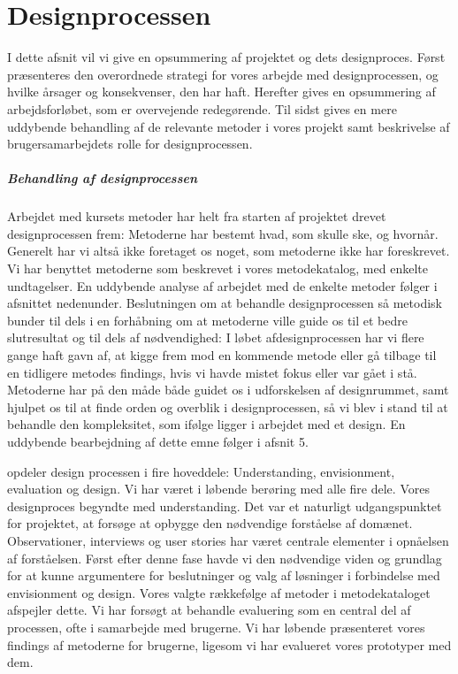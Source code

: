 \chapter{Designprocessen}
I dette afsnit vil vi give en opsummering af projektet og dets designproces.
Først præsenteres den overordnede strategi for vores arbejde med designprocessen, og hvilke årsager og konsekvenser, den har haft.
Herefter gives en opsummering af arbejdsforløbet, som er overvejende redegørende. 
Til sidst gives en mere uddybende behandling af de relevante metoder i vores projekt samt beskrivelse af brugersamarbejdets rolle for designprocessen.

\paragraph{Behandling af designprocessen}
Arbejdet med kursets metoder har helt fra starten af projektet drevet designprocessen frem: Metoderne har bestemt hvad, som skulle ske, og hvornår. Generelt har vi altså ikke foretaget os noget, som metoderne ikke har foreskrevet. Vi har benyttet metoderne som beskrevet i vores metodekatalog, med enkelte undtagelser. En uddybende analyse af arbejdet med de enkelte metoder følger i afsnittet nedenunder.
Beslutningen om at behandle designprocessen så metodisk bunder til dels i en forhåbning om at metoderne ville guide os til et bedre slutresultat og til dels af nødvendighed: I løbet afdesignprocessen har vi flere gange haft gavn af, at kigge frem mod en kommende metode eller gå tilbage til en tidligere metodes findings, hvis vi havde mistet fokus eller var gået i stå. 
Metoderne har på den måde både guidet os i udforskelsen af designrummet, samt hjulpet os til at finde orden og overblik i designprocessen, så vi blev i stand til at behandle den kompleksitet, som ifølge \citep{Stolterman} ligger i arbejdet med et design. En uddybende bearbejdning af dette emne følger i afsnit 5.

\citep{Benyon} opdeler design processen i fire hoveddele: Understanding, envisionment, evaluation og design. Vi har været i løbende berøring med alle fire dele. 
Vores designproces begyndte med understanding. Det var et naturligt udgangspunktet for projektet, at forsøge at opbygge den nødvendige forståelse af domænet. Observationer, interviews og user stories har været centrale elementer i opnåelsen af forståelsen. Først efter denne fase havde vi den nødvendige viden og grundlag for at kunne argumentere for beslutninger og valg af løsninger i forbindelse med envisionment og design. Vores valgte rækkefølge af metoder i metodekataloget afspejler dette.
Vi har forsøgt at behandle evaluering som en central del af processen, ofte i samarbejde med brugerne. Vi har løbende præsenteret vores findings af metoderne for brugerne, ligesom vi har evalueret vores prototyper med dem.

